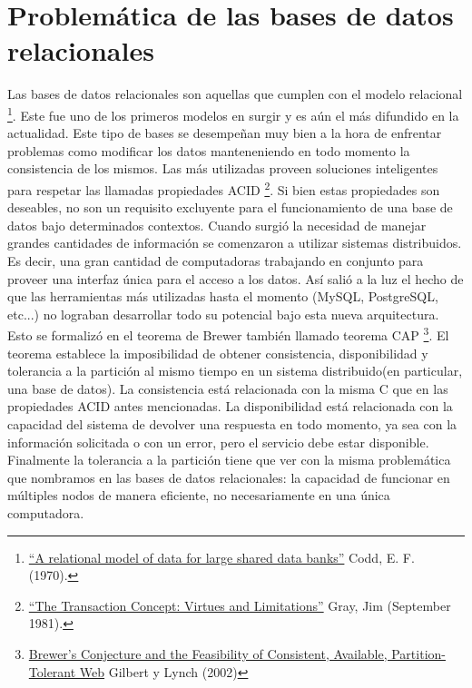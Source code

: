 \documentclass[11pt,a4paper]{article}
\begin{document}
\section{Problemática de las bases de datos relacionales}
Las bases de datos relacionales son aquellas que cumplen con el modelo relacional \footnote{ \href{http://www.seas.upenn.edu/~zives/03f/cis550/codd.pdf}{``A relational model of data for large shared data banks''} Codd, E. F. (1970). }. Este fue uno de los primeros modelos en surgir y es aún el más difundido en la actualidad. Este tipo de bases se desempeñan muy bien a la hora de enfrentar problemas como modificar los datos manteneniendo en todo momento la consistencia de los mismos. Las más utilizadas proveen soluciones inteligentes para respetar las llamadas propiedades ACID \footnote{ \href{http://research.microsoft.com/en-us/um/people/gray/papers/theTransactionConcept.pdf}{``The Transaction Concept: Virtues and Limitations''} Gray, Jim (September 1981).}. Si bien estas propiedades son deseables, no son un requisito excluyente para el funcionamiento de una base de datos bajo determinados contextos. Cuando surgió la necesidad de manejar grandes cantidades de información se comenzaron a utilizar sistemas distribuidos. Es decir, una gran cantidad de computadoras trabajando en conjunto para proveer una interfaz única para el acceso a los datos. Así salió a la luz el hecho de que las herramientas más utilizadas hasta el momento (MySQL, PostgreSQL, etc...) no lograban desarrollar todo su potencial bajo esta nueva arquitectura. Esto se formalizó en el teorema de Brewer también llamado teorema CAP \footnote{ \href{http://webpages.cs.luc.edu/~pld/353/gilbert_lynch_brewer_proof.pdf}{Brewer’s Conjecture and the Feasibility of
Consistent, Available, Partition-Tolerant Web} Gilbert y Lynch (2002)}. El teorema establece la imposibilidad de obtener consistencia, disponibilidad y tolerancia a la partición al mismo tiempo en un sistema distribuido(en particular, una base de datos). La consistencia está relacionada con la misma C que en las propiedades ACID antes mencionadas. La disponibilidad está relacionada con la capacidad del sistema de devolver una respuesta en todo momento, ya sea con la información solicitada o con un error, pero el servicio debe estar disponible. Finalmente la tolerancia a la partición tiene que ver con la misma problemática que nombramos en las bases de datos relacionales: la capacidad de funcionar en múltiples nodos de manera eficiente, no necesariamente en una única computadora.
\end{document}
